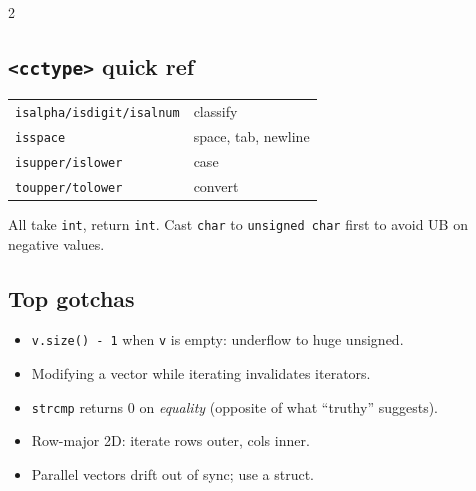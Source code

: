 \documentclass[10pt]{article}
\begin{document}
\begin{multicols}{2}
\subsection*{\texttt{<cctype>} quick ref}
\begin{tabular}{@{}ll@{}}
\texttt{isalpha/isdigit/isalnum} & classify\\
\texttt{isspace}                 & space, tab, newline\\
\texttt{isupper/islower}         & case\\
\texttt{toupper/tolower}         & convert
\end{tabular}
All take \texttt{int}, return \texttt{int}. Cast \texttt{char} to
\texttt{unsigned char} first to avoid UB on negative values.

\subsection*{Top gotchas}
\begin{itemize}
    \item \texttt{v.size() - 1} when \texttt{v} is empty: underflow
    to huge unsigned.
    \item Modifying a vector while iterating invalidates iterators.
    \item \texttt{strcmp} returns 0 on \emph{equality} (opposite of
    what ``truthy'' suggests).
    \item Row-major 2D: iterate rows outer, cols inner.
    \item Parallel vectors drift out of sync; use a struct.
\end{itemize}

\end{multicols}
\end{document}
